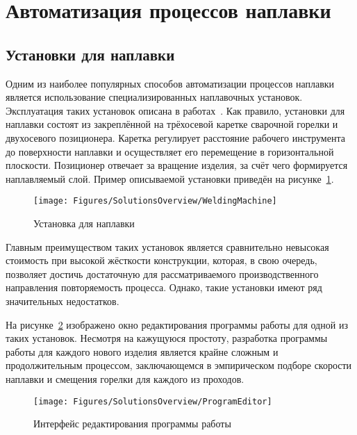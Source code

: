\section{Автоматизация процессов наплавки}

\subsection{Установки для наплавки} \label{subsec:WeldingMachines}
Одним из наиболее популярных способов автоматизации процессов наплавки является использование специализированных наплавочных установок.
Эксплуатация таких установок описана в работах~\cite{Qi_2019, Baskoro_2016, Deyong_You_2014, Jafari_2010, Su_2010, Yi_Jinggang_2010}.
Как правило, установки для наплавки состоят из закреплённой на трёхосевой каретке сварочной горелки и двухосевого позиционера.
Каретка регулирует расстояние рабочего инструмента до поверхности наплавки и осуществляет его перемещение в горизонтальной плоскости.
Позиционер отвечает за вращение изделия, за счёт чего формируется наплавляемый слой.
Пример описываемой установки приведён на рисунке~\ref{fig:Overview:WeldingMachine}.

\begin{figure}[H]
    \centering
    \vspace{14pt}
    \texttt{[image: Figures/SolutionsOverview/WeldingMachine]}
    \caption{Установка для наплавки}
    \label{fig:Overview:WeldingMachine}
\end{figure}

Главным преимуществом таких установок является сравнительно невысокая стоимость при высокой жёсткости конструкции, которая, в свою очередь, позволяет достичь достаточную для рассматриваемого производственного направления повторяемость процесса.
Однако, такие установки имеют ряд значительных недостатков.

На рисунке~\ref{fig:Overview:ProgramEditor} изображено окно редактирования программы работы для одной из таких установок.
Несмотря на кажущуюся простоту, разработка программы работы для каждого нового изделия является крайне сложным и продолжительным процессом, заключающемся в эмпирическом подборе скорости наплавки и смещения горелки для каждого из проходов.

\begin{figure}[H]
    \centering
    \vspace{14pt}
    \texttt{[image: Figures/SolutionsOverview/ProgramEditor]}
    \caption{Интерфейс редактирования программы работы}
    \label{fig:Overview:ProgramEditor}
\end{figure}

